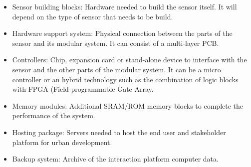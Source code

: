\begin{itemize}
\item Sensor building blocks: Hardware needed to build the sensor itself. It will depend on the type of sensor that needs to be build.
\item Hardware support system: Physical connection between the parts of the sensor and its modular system. It can consist of a multi-layer PCB.
\item Controllers: Chip, expansion card or stand-alone device to interface with the sensor and the other parts of the modular system. It can be a micro controller or an hybrid technology such as the combination of logic blocks with FPGA (Field-programmable Gate Array.
\item Memory modules: Additional SRAM/ROM memory blocks to complete the performance of the system.
\item Hosting package: Servers needed to host the end user and stakeholder platform for urban development.
\item Backup system: Archive of the interaction platform computer data. 
\end{itemize}

